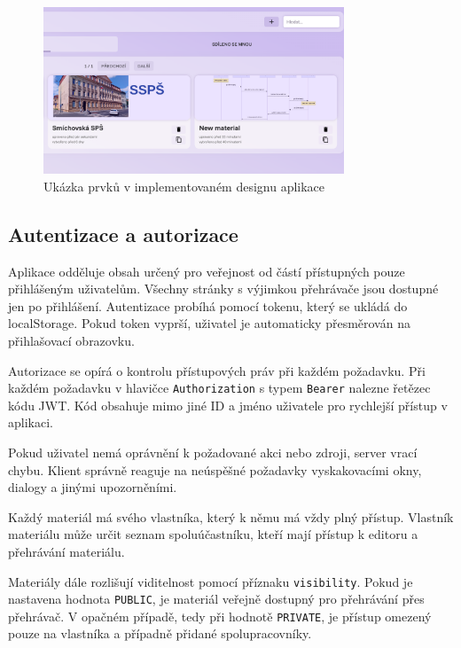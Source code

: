 \begin{figure}[ht!]
    \centering
    \includegraphics[width=0.8\textwidth]{media/05_realizace/design.png}
    \caption{Ukázka prvků v implementovaném designu aplikace}
    \label{fig:realizace/design}
\end{figure}


\subsection{Autentizace a autorizace}

Aplikace odděluje obsah určený pro veřejnost od částí přístupných pouze přihlášeným uživatelům. 
Všechny stránky s výjimkou přehrávače jsou dostupné jen po přihlášení. 
Autentizace probíhá pomocí tokenu, který se ukládá do localStorage. 
Pokud token vyprší, uživatel je automaticky přesměrován na přihlašovací obrazovku.

Autorizace se opírá o kontrolu přístupových práv při každém požadavku. 
Při každém požadavku v hlavičce \texttt{Authorization} s typem \texttt{Bearer} nalezne řetězec kódu JWT.
Kód obsahuje mimo jiné ID a jméno uživatele pro rychlejší přístup v aplikaci.

Pokud uživatel nemá oprávnění k požadované akci nebo zdroji, server vrací chybu. 
Klient správně reaguje na neúspěšné požadavky vyskakovacími okny, dialogy a jinými upozorněními.

Každý materiál má svého vlastníka, který k němu má vždy plný přístup. 
Vlastník materiálu může určit seznam spoluúčastníku, kteří mají přístup k editoru a přehrávání materiálu.

Materiály dále rozlišují viditelnost pomocí příznaku \texttt{visibility}. 
Pokud je nastavena hodnota \texttt{PUBLIC}, je materiál veřejně dostupný pro přehrávání přes přehrávač. 
V opačném případě, tedy při hodnotě \texttt{PRIVATE}, je přístup omezený pouze na vlastníka a případně přidané spolupracovníky.


